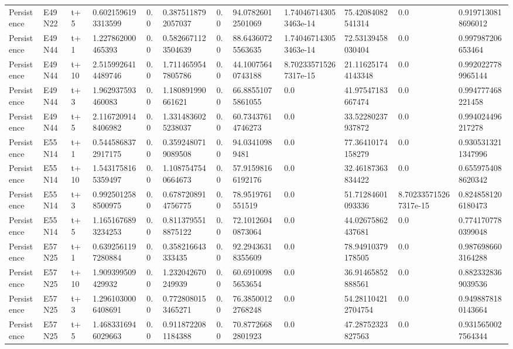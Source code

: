 \begin{landscape}
\begin{longtable}{llllllllllll}
Persistence & E49N22 & t+5 & 0.6021596193313599 & 0.0 & 0.3875118792057037 & 0.0 & 94.07826012501069 & 1.740467143053463e-14 & 75.42084082541314 & 0.0 & 0.9197130818696012 \\
Persistence & E49N44 & t+1 & 1.227862000465393 & 0.0 & 0.5826671123504639 & 0.0 & 88.64360725563635 & 1.740467143053463e-14 & 72.53139458030404 & 0.0 & 0.997987206653464 \\
Persistence & E49N44 & t+10 & 2.5159926414489746 & 0.0 & 1.7114659547805786 & 0.0 & 44.10075640743188 & 8.702335715267317e-15 & 21.116251744143348 & 0.0 & 0.9920227789965144 \\
Persistence & E49N44 & t+3 & 1.962937593460083 & 0.0 & 1.180891990661621 & 0.0 & 66.88551075861055 & 0.0 & 41.97547183667474 & 0.0 & 0.994777468221458 \\
Persistence & E49N44 & t+5 & 2.1167209148406982 & 0.0 & 1.3314836025238037 & 0.0 & 60.73437614746273 & 0.0 & 33.52280237937872 & 0.0 & 0.994024496217278 \\
Persistence & E55N14 & t+1 & 0.5445868372917175 & 0.0 & 0.3592480719089508 & 0.0 & 94.03410989481 & 0.0 & 77.36410174158279 & 0.0 & 0.9305313211347996 \\
Persistence & E55N14 & t+10 & 1.5431758165359497 & 0.0 & 1.1087547540664673 & 0.0 & 57.91598166192176 & 0.0 & 32.46187363834422 & 0.0 & 0.6559754088620342 \\
Persistence & E55N14 & t+3 & 0.9925012588500975 & 0.0 & 0.6787208914756775 & 0.0 & 78.9519761551519 & 0.0 & 51.71284601093336 & 8.702335715267317e-15 & 0.8248581206180473 \\
Persistence & E55N14 & t+5 & 1.1651676893234253 & 0.0 & 0.8113795518875122 & 0.0 & 72.10126040873064 & 0.0 & 44.02675862437681 & 0.0 & 0.7741707780399048 \\
Persistence & E57N25 & t+1 & 0.6392561197280884 & 0.0 & 0.358216643333435 & 0.0 & 92.29436318355609 & 0.0 & 78.94910379178505 & 0.0 & 0.9876986603164288 \\
Persistence & E57N25 & t+10 & 1.909399509429932 & 0.0 & 1.232042670249939 & 0.0 & 60.69100985653654 & 0.0 & 36.91465852888561 & 0.0 & 0.8823328369039536 \\
Persistence & E57N25 & t+3 & 1.2961030006408691 & 0.0 & 0.7728080153465271 & 0.0 & 76.38500122768248 & 0.0 & 54.281104212704754 & 0.0 & 0.9498878180143664 \\
Persistence & E57N25 & t+5 & 1.4683316946029663 & 0.0 & 0.9118722081184388 & 0.0 & 70.87726682801923 & 0.0 & 47.28752323827563 & 0.0 & 0.9315650027564344 \\

\end{longtable}
\end{landscape}
